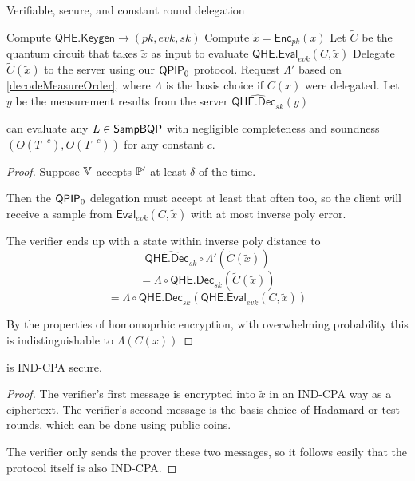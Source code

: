 \begin{algorithm}
	\caption{Verifiable, secure, and constant round delegation}
	\label{ProtoPriv}
	\begin{algorithmic}[1]
			\State Compute $\mathsf{QHE.Keygen}\rightarrow(pk, evk, sk)$
			\State Compute $\tilde{x}=\mathsf{Enc}_{pk}(x)$
			\State Let $\tilde{C}$ be the quantum circuit that takes $\tilde{x}$ as input to evaluate $\mathsf{QHE.Eval}_{evk}(C, \tilde{x})$
			\State Delegate $\tilde{C}(\tilde{x})$ to the server using our $\operatorname{\mathsf{QPIP}}_0$ protocol.
			\State Request $\Lambda'$ based on \autoref{decodeMeasureOrder}, where $\Lambda$ is the basis choice if $C(x)$ were delegated.
			\State Let $y$ be the measurement results from the server
			\State \Return $\widehat{\mathsf{QHE.Dec}_{sk}}(y)$
		\EndProcedure
	\end{algorithmic}
\end{algorithm}

\begin{thm}
    \label{QPIP1thm}
	 can evaluate any $L\in\operatorname{\mathsf{SampBQP}}$ with negligible completeness and soundness $(O(T^{-c}), O(T^{-c}))$ for any constant $c$.
\end{thm}
\begin{proof}
	Suppose $\mathbb{V}$ accepts $\mathbb{P}'$ at least $\delta$ of the time.

	Then the $\operatorname{\mathsf{QPIP}}_0$ delegation must accept at least that often too,
	so the client will receive a sample from $\mathsf{Eval}_{evk}(C, \tilde{x})$ with at most inverse poly error. 

	The verifier ends up with a state within inverse poly distance to
		$$\widehat{\mathsf{QHE.Dec}_{sk}}\circ\Lambda'(\tilde{C}(\tilde{x}))$$
		$$=\Lambda\circ\mathsf{QHE.Dec}_{sk}(\tilde{C}(\tilde{x}))$$
		$$=\Lambda\circ\mathsf{QHE.Dec}_{sk}(\mathsf{QHE.Eval}_{evk}(C, \tilde{x}))$$

	By the properties of homomoprhic encryption, with overwhelming probability this is indistinguishable to  $\Lambda(C(x))$
\end{proof}

\begin{thm}
	 is IND-CPA secure.
\end{thm}
\begin{proof}
	The verifier's first message is encrypted into $\tilde{x}$ in an IND-CPA way as a ciphertext.
	The verifier's second message is the basis choice of Hadamard or test rounds, which can be done using public coins.

	The verifier only sends the prover these two messages, so it follows  easily that the protocol itself is also IND-CPA. 
\end{proof}
